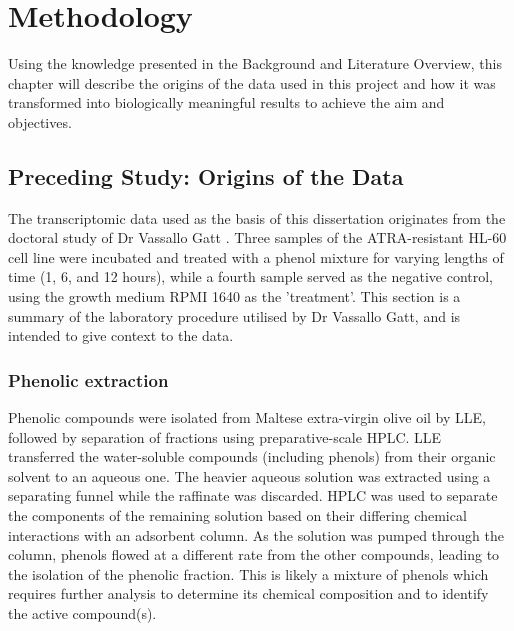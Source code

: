 \chapter{Methodology}
\label{method}




Using the knowledge presented in the Background and Literature Overview, this chapter will describe the origins of the data used in this project and how it was transformed into biologically meaningful results to achieve the aim and objectives.

\section{Preceding Study: Origins of the Data}
\label{method:prelim study}
The transcriptomic data used as the basis of this dissertation originates from the doctoral study of Dr Vassallo Gatt  \citep{Gatt2016}. Three samples of the \ac{ATRA}-resistant HL-60 cell line were incubated and treated with a phenol mixture for varying lengths of time (1, 6, and 12 hours), while a fourth sample served as the negative control, using the growth medium RPMI 1640 as the 'treatment'. This section is a summary of the laboratory procedure utilised by Dr Vassallo Gatt, and is intended to give context to the data.

\subsection{Phenolic extraction}
Phenolic compounds were isolated from Maltese extra-virgin olive oil by \ac{LLE}, followed by separation of fractions using preparative-scale \ac{HPLC}. \ac{LLE} transferred the water-soluble compounds (including phenols) from their organic solvent to an aqueous one. The heavier aqueous solution was extracted using a separating funnel while the raffinate was discarded. \ac{HPLC} was used to separate the components of the remaining solution based on their differing chemical interactions with an adsorbent column. As the solution was pumped through the column, phenols flowed at a different rate from the other compounds, leading to the isolation of the phenolic fraction. This is likely a mixture of phenols which requires further analysis to determine its chemical composition and to identify the active compound(s).

